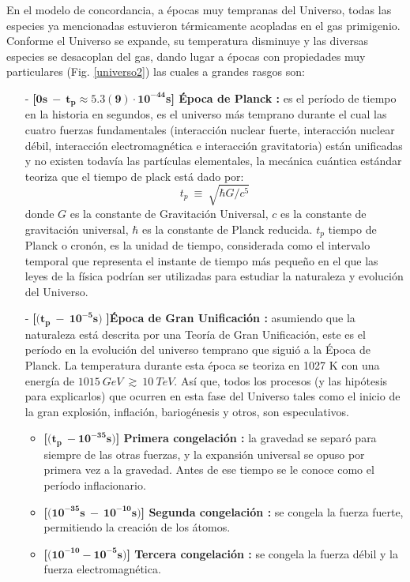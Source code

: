 En el modelo de concordancia, a épocas muy tempranas del Universo, todas
las especies ya mencionadas estuvieron térmicamente acopladas en el gas primigenio. Conforme el Universo se expande, su temperatura disminuye y las diversas especies se desacoplan del gas, dando lugar a épocas con propiedades muy particulares (Fig. \ref{universo2}) las cuales a grandes rasgos son:
\begin{itemize}
\item[-] \textbf{[}$\mathbf{0s ~ - ~ t_p \approx 5.3(9)\cdot 10^{-44}}$\textbf{s] Época de Planck :} es el período de tiempo en la historia en segundos, es el universo más temprano durante el cual las cuatro fuerzas fundamentales (interacción nuclear fuerte, interacción nuclear débil, interacción electromagnética e interacción gravitatoria) están unificadas y no existen todavía las partículas elementales, la mecánica cuántica estándar teoriza que el tiempo de plack está dado por:
\begin{equation}
t_p ~ \equiv ~ \sqrt{\hbar G/c^5}
\end{equation}
donde $G$ es la constante de Gravitación Universal, $c$ es la constante de gravitación universal, $\hbar$  es la constante de Planck reducida. $t_p$ tiempo de Planck o cronón, es la unidad de tiempo, considerada como el intervalo temporal que representa el instante de tiempo más pequeño en el que las leyes de la física podrían ser utilizadas para estudiar la naturaleza y evolución del Universo.
\item[-] \textbf{[}$(\mathbf{t_p ~ - ~ 10^{-5}s)}$ \textbf{ ]Época de Gran Unificación :}  asumiendo que la naturaleza está descrita por una Teoría de Gran Unificación, este es el período en la evolución del universo temprano que siguió a la Época de Planck. La temperatura durante esta época se teoriza en 1027 K con una energía de $1015 ~GeV ~ \gtrsim ~10 ~ TeV$. Así que, todos los procesos (y las hipótesis para explicarlos) que ocurren en esta fase del Universo tales como el inicio de la gran explosión, inflación, bariogénesis y otros, son especulativos.
\begin{itemize}
\item \textbf{[}$(\mathbf{t_p ~ - 10^{-35}s )}$\textbf{] Primera congelación :}  la gravedad se separó para siempre de las otras fuerzas, y la expansión universal se opuso por primera vez a la gravedad. Antes de ese tiempo se le conoce como el período inflacionario.
\item \textbf{[}$(\mathbf{10^{-35}s ~ - ~ 10^{-10}s)}$\textbf{] Segunda congelación :}  se congela la fuerza fuerte, permitiendo la creación de los átomos.
\item \textbf{[}$(\mathbf{10^{-10} - 10^{-5}s )}$\textbf{] Tercera congelación :} se congela la fuerza débil y la fuerza electromagnética.
\end{itemize}


\end{itemize}
